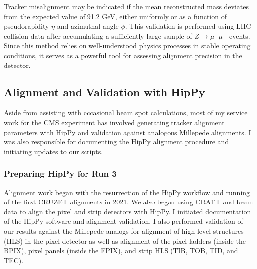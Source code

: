 Tracker misalignment may be indicated if the mean reconstructed mass deviates from the expected value of 91.2 GeV, either uniformly or as a function of pseudorapidity \( \eta \) and azimuthal angle \( \phi \). This validation is performed using LHC collision data after accumulating a sufficiently large sample of \( Z \to \mu^+\mu^- \) events. Since this method relies on well-understood physics processes in stable operating conditions, it serves as a powerful tool for assessing alignment precision in the detector.

\subsection{Alignment and Validation with HipPy} \label{sec:alignment}

Aside from assisting with occasional beam spot calculations, most of my service work for the CMS experiment has involved generating tracker alignment parameters with HipPy and validation against analogous Millepede alignments. I was also responsible for documenting the HipPy alignment procedure and initiating updates to our scripts. 

\subsubsection{Preparing HipPy for Run 3}

Alignment work began with the resurrection of the HipPy workflow and running of the first CRUZET alignments in 2021. We also began using CRAFT and beam data to align the pixel and strip detectors with HipPy. I initiated documentation of the HipPy software and alignment validation. I also performed validation of our results against the Millepede analogs for alignment of high-level structures (HLS) in the pixel detector as well as alignment of the pixel ladders (inside the BPIX), pixel panels (inside the FPIX), and strip HLS (TIB, TOB, TID, and TEC). 

